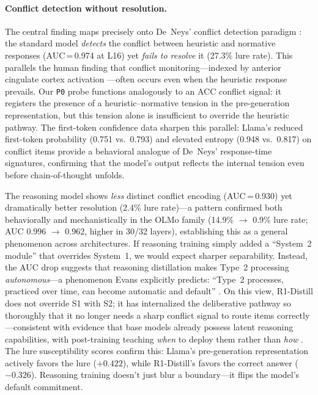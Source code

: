 \documentclass[twocolumn,10pt]{article}
\newcommand{\pzero}{\texttt{P0}}
\begin{document}
\paragraph{Conflict detection without resolution.}
The central finding maps precisely onto De~Neys' conflict detection
paradigm \citep{deneys2012bias, deneys2017dual}: the standard model
\emph{detects} the conflict between heuristic and normative responses
(AUC\,=\,0.974 at L16) yet \emph{fails to resolve} it (27.3\% lure
rate).  This parallels the human finding that conflict monitoring---indexed
by anterior cingulate cortex activation \citep{botvinick2001conflict,
kerns2004anterior}---often occurs even when the heuristic response
prevails.  Our \pzero{} probe functions analogously to an ACC conflict
signal: it registers the presence of a heuristic--normative tension in
the pre-generation representation, but this tension alone is insufficient
to override the heuristic pathway.  The first-token confidence data
sharpen this parallel: Llama's reduced first-token probability (0.751
vs.\ 0.793) and elevated entropy (0.948 vs.\ 0.817) on conflict items
provide a behavioral analogue of De~Neys' response-time signatures,
confirming that the model's output reflects the internal tension even
before chain-of-thought unfolds.

The reasoning model shows \emph{less} distinct conflict encoding
(AUC\,=\,0.930) yet dramatically better resolution (2.4\% lure rate)---a
pattern confirmed both behaviorally and mechanistically in the OLMo
family (14.9\% $\to$ 0.9\% lure rate; AUC 0.996 $\to$ 0.962, higher
in 30/32 layers), establishing this as a general phenomenon across
architectures.
If reasoning training simply added a ``System~2 module'' that overrides
System~1, we would expect sharper separability.  Instead, the AUC drop
suggests that reasoning distillation makes Type~2 processing
\emph{autonomous}---a phenomenon Evans explicitly predicts:
``Type~2 processes, practiced over time, can become automatic and
default'' \citep{evans2019reflections, evans2013dual}.  On this view,
R1-Distill does not override S1 with S2; it has internalized the
deliberative pathway so thoroughly that it no longer needs a sharp
conflict signal to route items correctly---consistent with evidence
that base models already possess latent reasoning capabilities, with
post-training teaching \emph{when} to deploy them rather than
\emph{how} \citep{venhoff2025base}.  The lure susceptibility scores
confirm this: Llama's pre-generation representation actively favors the
lure ($+0.422$), while R1-Distill's favors the correct answer
($-0.326$).  Reasoning training doesn't just blur a boundary---it
flips the model's default commitment.
\end{document}
